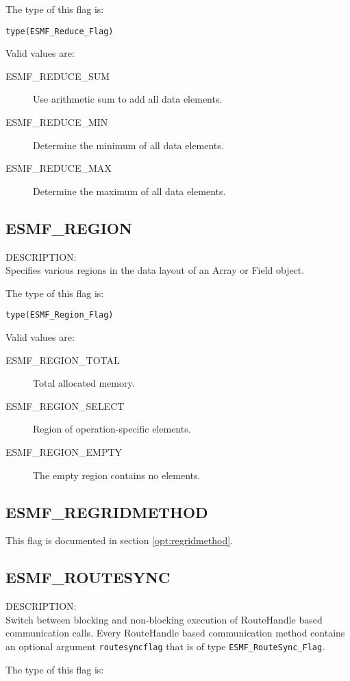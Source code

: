 The type of this flag is:

{\tt type(ESMF\_Reduce\_Flag)}

Valid values are:
\begin{description}
   \item [ESMF\_REDUCE\_SUM]
         Use arithmetic sum to add all data elements.
   \item [ESMF\_REDUCE\_MIN]
         Determine the minimum of all data elements.
   \item [ESMF\_REDUCE\_MAX]
         Determine the maximum of all data elements.
\end{description}

\subsection{ESMF\_REGION}
\label{const:region}
{\sf DESCRIPTION:\\}
Specifies various regions in the data layout of an Array or Field object.

The type of this flag is:

{\tt type(ESMF\_Region\_Flag)}

Valid values are:
\begin{description}
\item [ESMF\_REGION\_TOTAL]
      Total allocated memory.
\item [ESMF\_REGION\_SELECT]
      Region of operation-specific elements.
\item [ESMF\_REGION\_EMPTY]
      The empty region contains no elements.
\end{description}

\subsection{ESMF\_REGRIDMETHOD}
This flag is documented in section \ref{opt:regridmethod}.

\subsection{ESMF\_ROUTESYNC}
\label{const:routesync}
{\sf DESCRIPTION:\\}  
Switch between blocking and non-blocking execution of RouteHandle based
communication calls. Every RouteHandle based communication method contains
an optional argument {\tt routesyncflag} that is of type {\tt ESMF\_RouteSync\_Flag}.

The type of this flag is:

